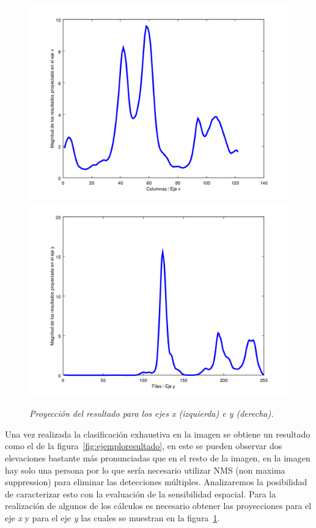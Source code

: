 \begin{figure}[H]
  \centering
  \includegraphics[scale=.35]{images/proyeccionx}
  \includegraphics[scale=.35]{images/proyecciony}
  \caption{\em Proyección del resultado para los ejes x (izquierda) e y (derecha).}  
  \label{fig:proyecciones}
\end{figure}

Una vez realizada la clasificación exhaustiva en la imagen se obtiene un resultado como el de la figura~\ref{fig:ejemploresultado}, en este se pueden observar dos elevaciones bastante más pronunciadas que en el resto de la imagen, en la imagen hay solo una persona por lo que sería necesario utilizar NMS (non maxima suppression) para eliminar las detecciones múltiples. Analizaremos la posibilidad de caracterizar esto con la evaluación de la sensibilidad espacial. Para la realización de algunos de los cálculos es necesario obtener las proyecciones para el eje \textit{x} y para el eje \textit{y} las cuales se muestran en la figura~\ref{fig:proyecciones}.


